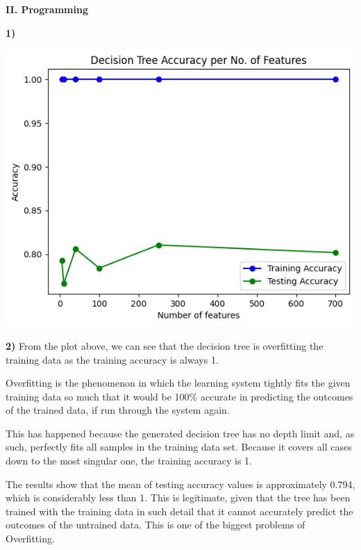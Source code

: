 \documentclass[11pt,a4paper]{article}
\begin{document}
\begin{center}
\textbf{II. Programming}
\end{center}

\begin{flushleft}
\textbf{1)} \par
\includegraphics[scale=0.75]{plot.png}
\end{flushleft}
\vspace*{2mm}

\begin{flushleft}
\textbf{2)}
From the plot above, we can see that the decision tree is overfitting the training data as the training accuracy is always 1.

Overfitting is the phenomenon in which the learning system tightly fits the given training data so much that it would be 100\% accurate in predicting the outcomes of the trained data, if run through the system again.

This has happened because the generated decision tree has no depth limit and, as such, perfectly fits all samples in the training data set. Because it covers all cases down to the most singular one, the training accuracy is 1.

The results show that the mean of testing accuracy values is approximately 0.794, which is considerably less than 1. This is legitimate, given that the tree has been trained with the training data in such detail that it cannot accurately predict the outcomes of the untrained data. This is one of the biggest problems of Overfitting.
\end{flushleft}
\end{document}

